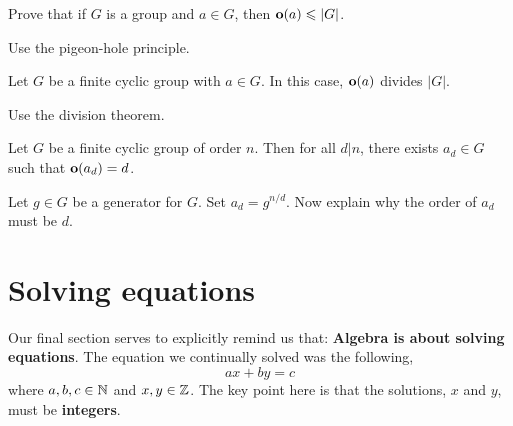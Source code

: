 \documentclass{ximera}
\begin{document}
\begin{lemma}
  Prove that if $G$ is a group and $a\in G$, then $\mathbf o(a)\leqslant |G|$.
  \begin{sketch}
    Use the pigeon-hole principle.
  \end{sketch}
\end{lemma}


\begin{theorem}
  Let $G$ be a finite cyclic group with $a\in G$. In this case,
  $\mathbf o(a)$ divides $|G|$.
  \begin{sketch}
    Use the division theorem.
  \end{sketch}
\end{theorem}

\begin{corollary}
  Let $G$ be a finite cyclic group of order $n$. Then for all $d|n$,
  there exists $a_d\in G$ such that $\mathbf o(a_d) = d$.
  \begin{sketch}
    Let $g\in G$ be a generator for $G$. Set $a_d = g^{n/d}$. Now
    explain why the order of $a_d$ must be $d$.
  \end{sketch}
\end{corollary}










\section{Solving equations}

Our final section serves to explicitly remind us that: \textbf{Algebra
  is about solving equations}. The equation we continually solved was
the following,
\[
ax + by = c
\]
where $a,b,c\in\mathbb N$ and $x,y\in\mathbb Z$. The key point here is that the
solutions, $x$ and $y$, must be \textbf{integers}.
\end{document}
